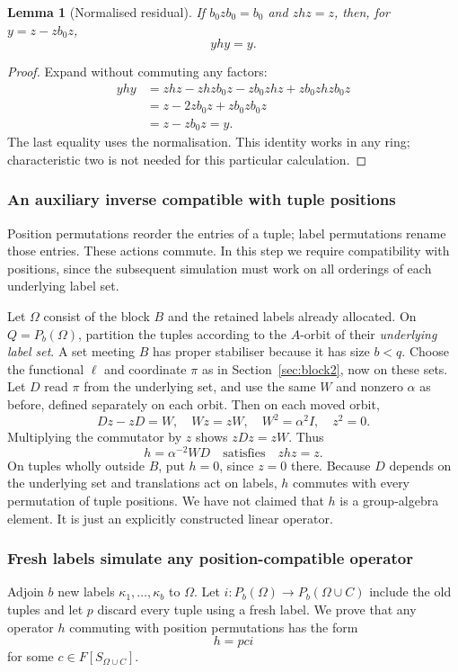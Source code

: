 \documentclass[11pt,a4paper]{article}
\newtheorem{lemma}[theorem]{Lemma}
\theoremstyle{definition}\newtheorem{definition}[theorem]{Definition}
\theoremstyle{remark}\newtheorem{remark}[theorem]{Remark}
\begin{document}
\begin{lemma}[Normalised residual]\label{lem:residual}
If $b_0zb_0=b_0$ and $zhz=z$, then, for $y=z-zb_0z$,
\[yhy=y.\]
\end{lemma}
\begin{proof}
Expand without commuting any factors:
\begin{align*}
yhy&=zhz-zhzb_0z-zb_0zhz+zb_0zhzb_0z\\
&=z-2zb_0z+zb_0zb_0z\\
&=z-zb_0z=y.
\end{align*}
The last equality uses the normalisation. This identity works in any ring; characteristic two is not needed for this particular calculation.
\end{proof}

\subsubsection{An auxiliary inverse compatible with tuple positions}
Position permutations reorder the entries of a tuple; label
permutations rename those entries. These actions commute. In this
step we require compatibility with positions, since the subsequent
simulation must work on all orderings of each underlying label set.

Let $\Omega$ consist of the block $B$ and the retained labels already allocated. On $Q=P_b(\Omega)$, partition the tuples according to the $A$-orbit of their \emph{underlying label set}. A set meeting $B$ has proper stabiliser because it has size $b<q$. Choose the functional $\ell$ and coordinate $\pi$ as in Section~\ref{sec:block2}, now on these sets. Let $D$ read $\pi$ from the underlying set, and use the same $W$ and nonzero $\alpha$ as before, defined separately on each orbit. Then on each moved orbit,
\[Dz-zD=W,\quad Wz=zW,\quad W^2=\alpha^2I,\quad z^2=0.\]
Multiplying the commutator by $z$ shows $zDz=zW$. Thus
\[h=\alpha^{-2}WD\quad\text{satisfies}\quad zhz=z.\]
On tuples wholly outside $B$, put $h=0$, since $z=0$ there. Because $D$ depends on the underlying set and translations act on labels, $h$ commutes with every permutation of tuple positions. We have not claimed that $h$ is a group-algebra element. It is just an explicitly constructed linear operator.

\subsubsection{Fresh labels simulate any position-compatible operator}
Adjoin $b$ new labels $\kappa_1,\ldots,\kappa_b$ to $\Omega$. Let $i:P_b(\Omega)\to P_b(\Omega\cup C)$ include the old tuples and let $p$ discard every tuple using a fresh label. We prove that any operator $h$ commuting with position permutations has the form
\begin{equation}\label{eq:compression}h=pci\end{equation}
for some $c\in F[S_{\Omega\cup C}]$.
\end{document}
